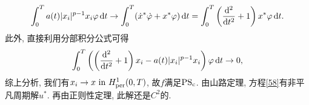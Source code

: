 \begin{example}
    \begin{equation*}
        \int_0^Ta(t)|x_i|^{p - 1}x_i\varphi \,{\rm d}t \rightarrow \int_0^T(\dot x^*\dot\varphi + x^*\varphi) \,{\rm d}t = \int_0^T\left(\frac{{\rm d}^2}{{\rm d}t^2} + 1\right)x^*\varphi \,{\rm d}t.
    \end{equation*}
    此外, 直接利用分部积分公式可得
    \begin{equation*}
        \int_0^T\left(\left(\frac{{\rm d}^2}{{\rm d}t^2} + 1\right)x_i - a(t)|x_i|^{p - 1}x_i\right)\varphi \,{\rm d}t \rightarrow 0,
    \end{equation*}
    综上分析, 我们有$x_i \rightarrow x\ {\rm in}\ H_{{\rm per}}^1(0, T)$, 故$f$满足${\rm PS_c}$.
    由山路定理, 方程\eqref{58}有非平凡周期解$u^*$. 再由正则性定理, 此解还是$C^2$的.
\end{example}
